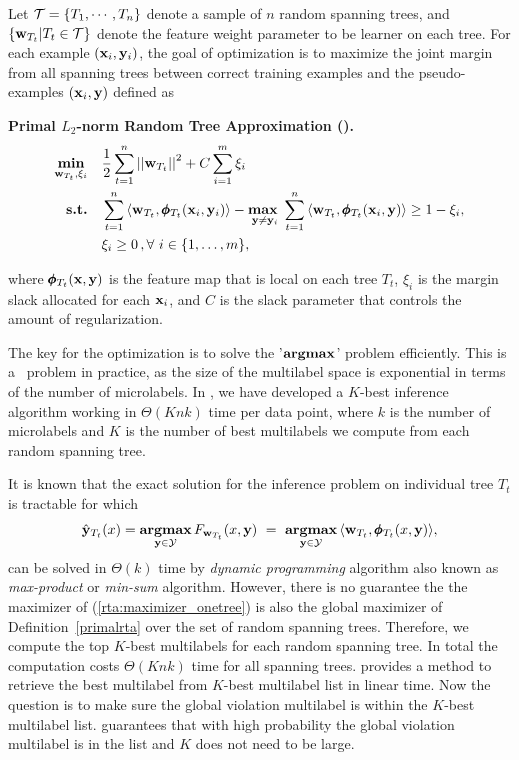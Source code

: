 {Let $\mathcal{T}=\{T_1,\cdots,T_n\}$ denote a sample of $n$ random spanning trees, and $\{\mathbf {w}_{T_t}|T_t\in\mathcal{T}\}$ denote the feature weight parameter to be learner on each tree.
For each example $(\mathbf {x}_i,\mathbf {y}_i)$, the goal of optimization is to maximize the joint margin from all spanning trees between correct training examples and the pseudo-examples $(\mathbf {x}_i,\mathbf {y})$ defined as
\begin{definition}{\bf Primal $L_2$-norm Random Tree Approximation (\rta).}\label{primalrta}
	\begin{align*}
		\underset{\vw_{T_t},\xi_i}{\minimize} & \quad \frac{1}{2}\sum_{t=1}^{n}\norm{\vw_{T_t}}^2 + C\sum_{i=1}^{m}\xi_i\\
		\st & \quad \sum_{t=1}^{n}{ \langle \vw_{T_t}, \phib_{T_t}(\vx_i,\vy_i) \rangle} - \underset{\vy \neq \vy_i}{\maximize\ } \sum_{t=1}^{n}{\langle \vw_{T_t}, \phib_{T_t}(\vx_i,\vy) \rangle } \geq 1 -  \xi_i, \\
		& \quad \xi_i\ge0\, , \forall\ i \in \set{1,\dots,m},
	\end{align*}
\end{definition}
where $\pmb \phi_{T_t}(\mathbf {x},\mathbf {y})$ is the feature map that is local on each tree $T_t$, $\xi_i$ is the margin slack allocated for each $\mathbf {x}_i$, and $C$ is the slack parameter that controls the amount of regularization.

The key for the optimization is to solve the '$\textbf{argmax}$' problem efficiently.
This is a \nphard\ problem in practice, as the size of the multilabel space is exponential in terms of the number of microlabels.
In , we have developed a $K$-best inference algorithm working in $\Theta(Knk)$ time per data point, where $k$ is the number of microlabels and $K$ is the number of best multilabels we compute from each random spanning tree.

It is known that the exact solution for the inference problem on individual tree $T_t$ is tractable \citep{Koller09probabilistic} for which 
\begin{align}
	\hat{\mathbf {y}}_{T_t}(x) = \underset{\mathbf {y}\in\mathcal{Y}}{\textbf{argmax}}\, F_{\mathbf {w}_{T_t}}(x,\mathbf {y})\ =\ \underset{\mathbf {y}\in\mathcal{Y}}{\textbf{argmax}}\, \langle \mathbf {w}_{T_t}, \pmb \phi_{T_t}(x,\mathbf {y})\rangle, \label{rta:maximizer_onetree}
\end{align}
can be solved in $\Theta(k)$ time by \textit{dynamic programming} algorithm also known as \textit{max-product} or \textit{min-sum} algorithm.
However, there is no guarantee the the maximizer of (\ref{rta:maximizer_onetree}) is also the global maximizer of Definition~\ref{primalrta} over the set of random spanning trees.
Therefore, we compute the top $K$-best multilabels for each random spanning tree.
In total the computation costs $\Theta(Knk)$ time for all spanning trees.
 provides a method to retrieve the best multilabel from $K$-best multilabel list in linear time.
Now the question is to make sure the global violation multilabel is within the $K$-best multilabel list.
 guarantees that with high probability the global violation multilabel is in the list and $K$ does not need to be large.

}
